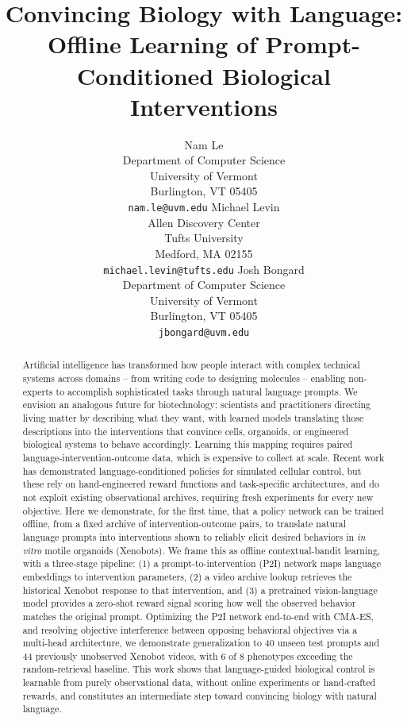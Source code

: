 \documentclass{article}
\title{Convincing Biology with Language: Offline Learning of Prompt-Conditioned Biological Interventions}
\author{%
  Nam Le \\
  Department of Computer Science \\
  University of Vermont \\
  Burlington, VT 05405 \\
  \texttt{nam.le@uvm.edu}
  \And
  Michael Levin \\
  Allen Discovery Center \\
  Tufts University \\
  Medford, MA 02155 \\
  \texttt{michael.levin@tufts.edu}
  \And
  Josh Bongard \\
  Department of Computer Science \\
  University of Vermont \\
  Burlington, VT 05405 \\
  \texttt{jbongard@uvm.edu}
}
\begin{document}
\maketitle


\begin{abstract}
Artificial intelligence has transformed how people interact with complex technical systems across domains -- from writing code to designing molecules -- enabling non-experts to accomplish sophisticated tasks through natural language prompts. We envision an analogous future for biotechnology: scientists and practitioners directing living matter by describing what they want, with learned models translating those descriptions into the interventions that convince cells, organoids, or engineered biological systems to behave accordingly. Learning this mapping requires paired language-intervention-outcome data, which is expensive to collect at scale. Recent work has demonstrated language-conditioned policies for simulated cellular control, but these rely on hand-engineered reward functions and task-specific architectures, and do not exploit existing observational archives, requiring fresh experiments for every new objective. Here we demonstrate, for the first time, that a policy network can be trained offline, from a fixed archive of intervention-outcome pairs, to translate natural language prompts into interventions shown to reliably elicit desired behaviors in \textit{in vitro} motile organoids (Xenobots). We frame this as offline contextual-bandit learning, with a three-stage pipeline: (1) a prompt-to-intervention (P2I) network maps language embeddings to intervention parameters, (2) a video archive lookup retrieves the historical Xenobot response to that intervention, and (3) a pretrained vision-language model provides a zero-shot reward signal scoring how well the observed behavior matches the original prompt. Optimizing the P2I network end-to-end with CMA-ES, and resolving objective interference between opposing behavioral objectives via a multi-head architecture, we demonstrate generalization to 40 unseen test prompts and 44 previously unobserved Xenobot videos, with 6 of 8 phenotypes exceeding the random-retrieval baseline. This work shows that language-guided biological control is learnable from purely observational data, without online experiments or hand-crafted rewards, and constitutes an intermediate step toward convincing biology with natural language.


\end{abstract}
\end{document}
